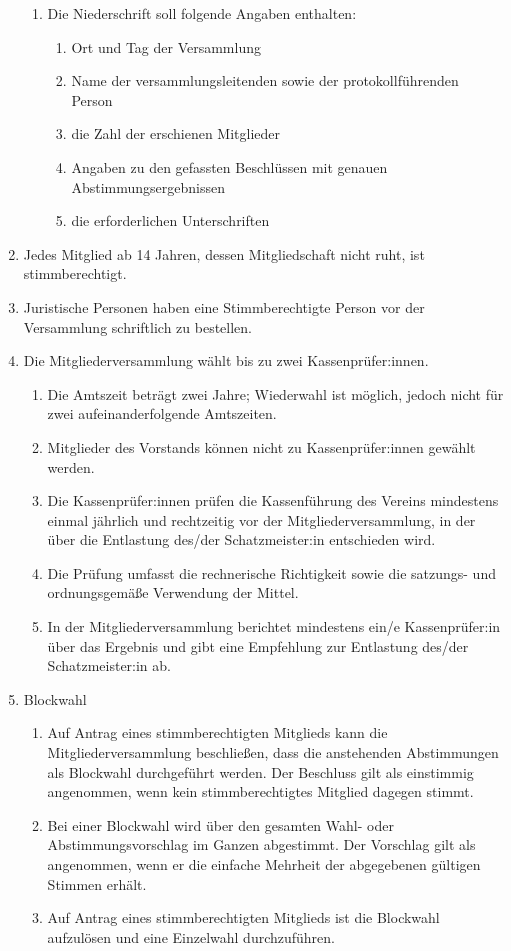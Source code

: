 \documentclass[a4paper, 12pt]{scrartcl}
\begin{document}
\begin{enumerate}
\begin{enumerate}
			\item Die Niederschrift soll folgende Angaben enthalten:
			\begin{enumerate}
	  		\item Ort und Tag der Versammlung
	    	\item Name der versammlungsleitenden sowie der protokollführenden Person
	    	\item die Zahl der erschienen Mitglieder
	    	\item Angaben zu den gefassten Beschlüssen mit genauen Abstimmungsergebnissen
	    	\item die erforderlichen Unterschriften
			\end{enumerate}
		\end{enumerate}
	\item \label{mv-ruhende-mitgliedschaft} Jedes Mitglied ab 14 Jahren, dessen Mitgliedschaft nicht ruht, ist stimmberechtigt.
	\item Juristische Personen haben eine Stimmberechtigte Person vor der Versammlung schriftlich zu bestellen.
	\item \label{mv-kassenpruefung} Die Mitgliederversammlung wählt bis zu zwei Kassenprüfer:innen.
	\begin{enumerate}
		\item Die Amtszeit beträgt zwei Jahre; Wiederwahl ist möglich, jedoch nicht für zwei aufeinanderfolgende Amtszeiten.
		\item Mitglieder des Vorstands können nicht zu Kassenprüfer:innen gewählt werden.
		\item Die Kassenprüfer:innen prüfen die Kassenführung des Vereins mindestens einmal jährlich und rechtzeitig vor der Mitgliederversammlung, in der über die Entlastung des/der Schatzmeister:in entschieden wird.
		\item Die Prüfung umfasst die rechnerische Richtigkeit sowie die satzungs- und ordnungsgemäße Verwendung der Mittel. 
		\item In der Mitgliederversammlung berichtet mindestens ein/e Kassenprüfer:in über das Ergebnis und gibt eine Empfehlung zur Entlastung des/der Schatzmeister:in ab.
	\end{enumerate}
	\item \label{mv-blockwahl} Blockwahl
		\begin{enumerate}
			\item Auf Antrag eines stimmberechtigten Mitglieds kann die Mitgliederversammlung beschließen, dass die anstehenden Abstimmungen als Blockwahl durchgeführt werden. Der Beschluss gilt als einstimmig angenommen, wenn kein stimmberechtigtes Mitglied dagegen stimmt.
			\item Bei einer Blockwahl wird über den gesamten Wahl- oder Abstimmungsvorschlag im Ganzen abgestimmt. Der Vorschlag gilt als angenommen, wenn er die einfache Mehrheit der abgegebenen gültigen Stimmen erhält.
			\item Auf Antrag eines stimmberechtigten Mitglieds ist die Blockwahl aufzulösen und eine Einzelwahl durchzuführen.
		\end{enumerate}	
\end{enumerate}
\end{document}
